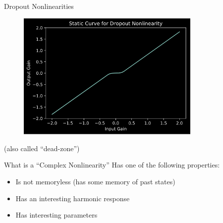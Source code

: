 \begin{frame}{Dropout Nonlinearities}
    \begin{figure}
        \includegraphics[width=3.5in]{../Paper/Pics/dropout.png}
    \end{figure}

    \begin{center}
        \scriptsize (also called ``dead-zone'')
    \end{center}
\end{frame}

\begin{frame}{What is a ``Complex Nonlinearity''}
    Has one of the following properties:\newline
    \begin{itemize}
        \item Is not memoryless (has some memory of past states)
        \item Has an interesting harmonic response
        \item Has interesting parameters
    \end{itemize}
\end{frame}
